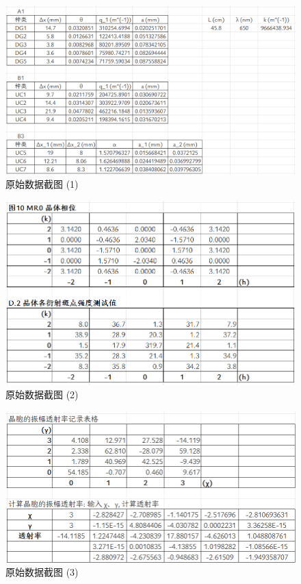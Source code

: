 \documentclass{customDoc}
\begin{document}
\begin{figure}[H]
    \centering
    \includegraphics[width=\textwidth]{originData-1.png}
    \caption{原始数据截图 (1)}
    \label{fig:data1}
\end{figure}
\begin{figure}[H]
    \centering
    \includegraphics[width=\textwidth]{originData-2.png}
    \caption{原始数据截图 (2)}
    \label{fig:data2}
\end{figure}
\begin{figure}[H]
    \centering
    \includegraphics[width=\textwidth]{originData-3.png}
    \caption{原始数据截图 (3)}
    \label{fig:data3}
\end{figure}
\end{document}
